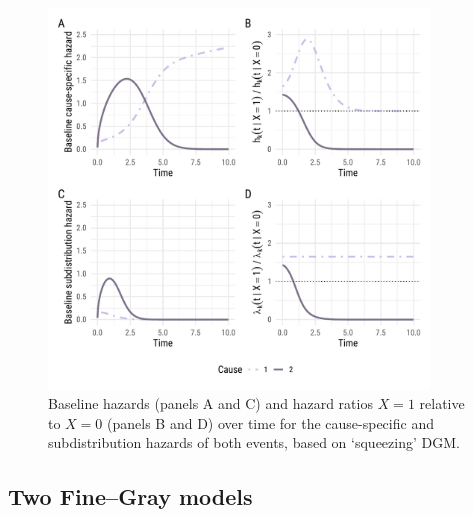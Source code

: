 \documentclass[
  letterpaper,
  DIV=11,
  numbers=noendperiod]{scrreprt}
\begin{document}
\begin{figure}

{\centering \includegraphics[width=0.9\textwidth,height=\textheight]{chapters/../figures/fine-gray-DGM_squeeze.pdf}

}

\caption{\label{fig-squeeze}Baseline hazards (panels A and C) and hazard
ratios \(X = 1\) relative to \(X = 0\) (panels B and D) over time for
the cause-specific and subdistribution hazards of both events, based on
`squeezing' DGM.}

\end{figure}

\hypertarget{two-finegray-models}{%
\subsection{Two Fine--Gray models}\label{two-finegray-models}}
\end{document}
